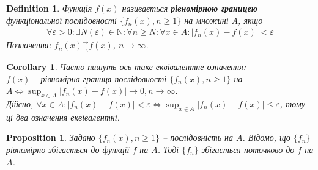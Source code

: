\documentclass[a4paper, 10pt]{article}
\def\huge{\displaystyle}
\theoremstyle{theoremdd}
\theoremstyle{theoremdd}
\theoremstyle{theoremdd}
\newtheorem{definition}[theorem]{Definition}
\theoremstyle{theoremdd}
\theoremstyle{theoremdd}
\theoremstyle{theoremdd}
\newtheorem{proposition}[theorem]{Proposition}
\theoremstyle{theoremdd}
\newtheorem{remark}[theorem]{Remark}
\theoremstyle{theoremdd}
\theoremstyle{theoremdd}
\newtheorem{corollary}[theorem]{Corollary}
\begin{document}

\begin{definition}
Функція $f(x)$ називається \textbf{рівномірною границею} функціональної послідовності $\{f_n(x), n \geq 1 \}$ на множині $A$, якщо
\begin{align*}
\forall \varepsilon > 0: \exists N(\varepsilon) \in \mathbb{N}: \forall n \geq N: \forall x \in A: |f_n(x)-f(x)| < \varepsilon
\end{align*}
Позначення: $f_n(x)^\rightarrow_\rightarrow f(x)$, $n \to \infty$.
\end{definition}

\begin{corollary}
Часто пишуть ось таке еквівалентне означення:\\
$f(x)$ -- рівномірна границя послідовності $\{f_n(x), n \geq 1\}$ на $A \iff \huge\sup_{x \in A} |f_n(x) - f(x)| \to 0, n \to \infty$.\\
\textit{Дійсно, $\forall x \in A: |f_n(x)-f(x)| < \varepsilon \iff \huge\sup_{x \in A} |f_n(x) - f(x)| \leq \varepsilon$, тому ці два означення еквівалентні}.
\end{corollary}

\begin{proposition}
Задано $\{f_n(x), n \geq 1\}$ -- послідовність на $A$. Відомо, що $\{f_n\}$ рівномірно збігається до функції $f$ на $A$. Тоді $\{f_n\}$ збігається поточково до $f$ на $A$.
\end{proposition}
\end{document}
